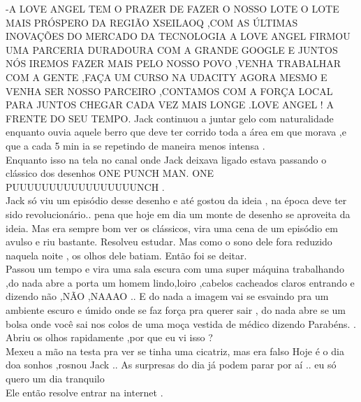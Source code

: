 \documentclass{book}
\begin{document}
-A LOVE ANGEL TEM O PRAZER DE FAZER O NOSSO LOTE O LOTE MAIS PRÓSPERO DA REGIÃO XSEILAOQ ,COM AS ÚLTIMAS INOVAÇÕES DO MERCADO DA TECNOLOGIA A LOVE ANGEL FIRMOU UMA PARCERIA DURADOURA COM A GRANDE GOOGLE E JUNTOS NÓS IREMOS FAZER MAIS PELO NOSSO POVO ,VENHA TRABALHAR COM A GENTE ,FAÇA UM CURSO NA UDACITY AGORA MESMO E VENHA SER NOSSO PARCEIRO ,CONTAMOS COM A FORÇA LOCAL PARA JUNTOS CHEGAR CADA VEZ MAIS LONGE .LOVE ANGEL ! A FRENTE DO SEU TEMPO.
Jack continuou a juntar gelo com naturalidade enquanto ouvia aquele berro que deve ter corrido toda a área em que morava ,e que a cada 5 min ia se repetindo de maneira menos intensa .\\
Enquanto isso na tela no canal onde Jack deixava ligado estava passando o clássico dos desenhos ONE PUNCH MAN. ONE PUUUUUUUUUUUUUUUUUNCH .\\
Jack só viu um episódio desse desenho e até gostou da ideia , na época deve ter sido revolucionário.. pena que hoje em dia um monte de desenho se aproveita da ideia. Mas era sempre bom ver os clássicos, vira uma cena de um episódio em avulso e riu bastante. Resolveu estudar. Mas como o sono dele fora reduzido naquela noite , os olhos dele batiam. Então foi se deitar.\\
Passou um tempo e vira uma sala escura com uma super máquina trabalhando ,do nada abre a porta um homem lindo,loiro ,cabelos cacheados claros entrando e dizendo não ,NÃO ,NAAAO .. E do nada a imagem vai se esvaindo pra um ambiente escuro e úmido onde se faz força pra querer sair , do nada abre se um bolsa onde você sai nos colos de uma moça vestida de médico dizendo Parabéns. . \\
Abriu os olhos rapidamente ,por que eu vi isso ?\\ 
Mexeu a mão na testa pra ver se tinha uma cicatriz, mas era falso 
Hoje é o dia doa sonhos ,rosnou Jack .. As surpresas do dia já podem parar por aí .. eu só quero um dia tranquilo \\
Ele então resolve entrar na internet  .\\
\end{document}
